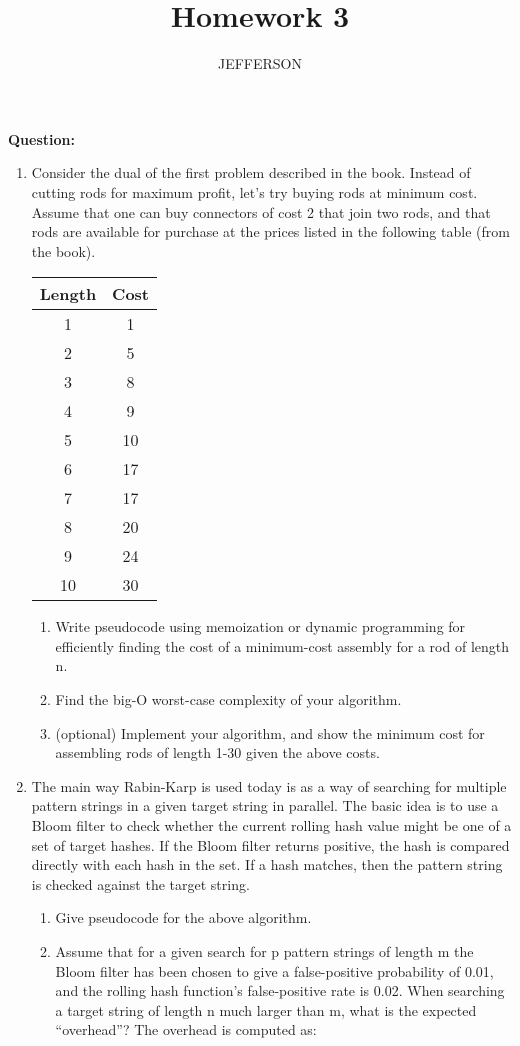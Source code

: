 \documentclass[11pt,letterpaper,oneside]{article}
\title{Homework 3}
\author{JEFFERSON}
\date{}
\begin{document}
\maketitle


\noindent\textbf{Question:}

\vspace{-1em}
\begin{enumerate}
  \itemsep1pt \parskip0pt 
  \item Consider the dual of the first problem described in the book. Instead of cutting rods for maximum profit, let's try buying rods at minimum cost. Assume that one can buy connectors of cost 2 that join two rods, and that rods are available for purchase at the prices listed in the following table (from the book).

\begin{tabular}{cc}
Length & Cost\\ \hline
1 & 1\\
2 & 5\\
3 & 8\\
4 & 9\\
5 & 10\\
6 & 17\\
7 & 17\\
8 & 20\\
9 & 24\\
10 & 30\\
\end{tabular}

\begin{enumerate} 
\item Write pseudocode using memoization or dynamic programming for efficiently finding the cost of a minimum-cost assembly for a rod of length n.
\item Find the big-O worst-case complexity of your algorithm.
\item  (optional) Implement your algorithm, and show the minimum cost for assembling rods of length 1-30 given the above costs.
\end{enumerate}

  \item The main way Rabin-Karp is used today is as a way of searching for multiple pattern strings in a given target string in parallel. The basic idea is to use a Bloom filter to check whether the current rolling hash value might be one of a set of target hashes. If the Bloom filter returns positive, the hash is compared directly with each hash in the set. If a hash matches, then the pattern string is checked against the target string.
\begin{enumerate} 
\item Give pseudocode for the above algorithm.
\item Assume that for a given search for p pattern strings of length m the Bloom filter has been chosen to give a false-positive probability of 0.01, and the rolling hash function's false-positive rate is 0.02. When searching a target string of length n much larger than m, what is the expected ``overhead''? The overhead is computed as:


\end{enumerate}
\end{enumerate}
\end{document}
